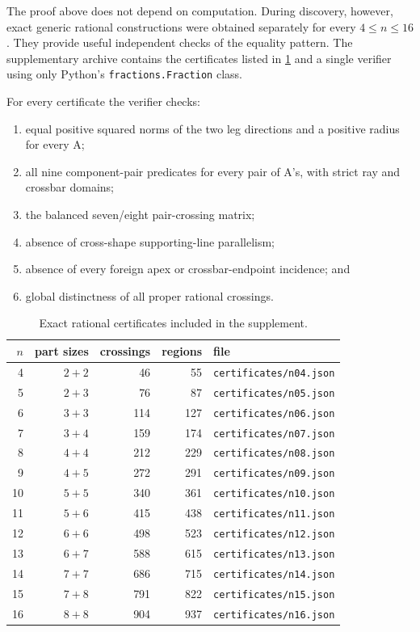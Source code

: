 \documentclass[11pt]{amsart}
\theoremstyle{definition}
\begin{document}
The proof above does not depend on computation.  During discovery, however,
exact generic rational constructions were obtained separately for every
$4\le n\le16$.  They provide useful independent checks of the equality
pattern.  The supplementary archive contains the certificates listed in
\cref{tab:certificates} and a single verifier using only Python's
\texttt{fractions.Fraction} class.

For every certificate the verifier checks:
\begin{enumerate}[label=(\roman*)]
\item equal positive squared norms of the two leg directions and a positive
radius for every A;
\item all nine component-pair predicates for every pair of A's, with strict
ray and crossbar domains;
\item the balanced seven/eight pair-crossing matrix;
\item absence of cross-shape supporting-line parallelism;
\item absence of every foreign apex or crossbar-endpoint incidence; and
\item global distinctness of all proper rational crossings.
\end{enumerate}

\begin{table}[ht]
\centering
\caption{Exact rational certificates included in the supplement.}
\label{tab:certificates}
\begin{tabular}{@{}rrrrl@{}}
\toprule
$n$ & part sizes & crossings & regions & file\\
\midrule
4  & $2+2$ & 46  & 55  & \texttt{certificates/n04.json}\\
5  & $2+3$ & 76  & 87  & \texttt{certificates/n05.json}\\
6  & $3+3$ & 114 & 127 & \texttt{certificates/n06.json}\\
7  & $3+4$ & 159 & 174 & \texttt{certificates/n07.json}\\
8  & $4+4$ & 212 & 229 & \texttt{certificates/n08.json}\\
9  & $4+5$ & 272 & 291 & \texttt{certificates/n09.json}\\
10 & $5+5$ & 340 & 361 & \texttt{certificates/n10.json}\\
11 & $5+6$ & 415 & 438 & \texttt{certificates/n11.json}\\
12 & $6+6$ & 498 & 523 & \texttt{certificates/n12.json}\\
13 & $6+7$ & 588 & 615 & \texttt{certificates/n13.json}\\
14 & $7+7$ & 686 & 715 & \texttt{certificates/n14.json}\\
15 & $7+8$ & 791 & 822 & \texttt{certificates/n15.json}\\
16 & $8+8$ & 904 & 937 & \texttt{certificates/n16.json}\\
\bottomrule
\end{tabular}
\end{table}
\end{document}
